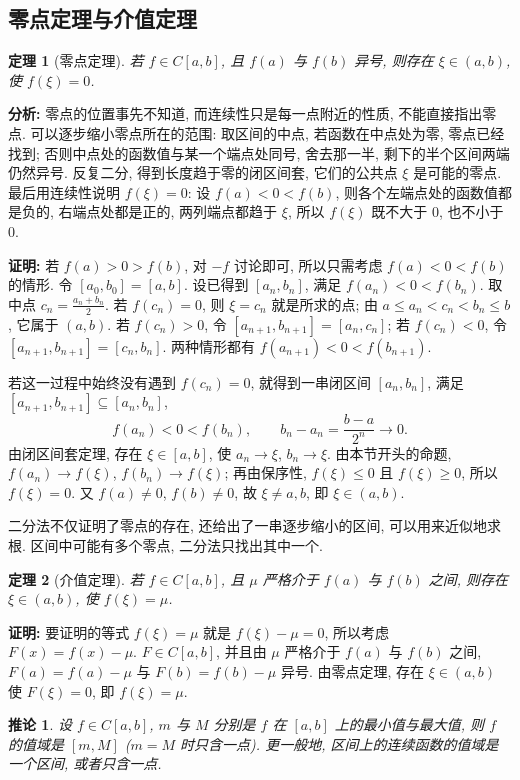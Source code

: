 \documentclass[UTF8,openany]{ctexbook}
\theoremstyle{chinesetextbook}
\newtheorem{theorem}{定理}[section]
\newenvironment{cnproof}{\par\indent\textbf{证明:} \ignorespaces}{\par}
\newtheorem*{corollarysingle}{推论}
\begin{document}
\subsection{零点定理与介值定理}
\begin{theorem}[零点定理]
若 $f\in C[a,b]$, 且 $f(a)$ 与 $f(b)$ 异号, 则存在 $\xi\in(a,b)$, 使 $f(\xi)=0$.
\end{theorem}
\par\indent\textbf{分析:} 零点的位置事先不知道, 而连续性只是每一点附近的性质, 不能直接指出零点. 可以逐步缩小零点所在的范围: 取区间的中点, 若函数在中点处为零, 零点已经找到; 否则中点处的函数值与某一个端点处同号, 舍去那一半, 剩下的半个区间两端仍然异号. 反复二分, 得到长度趋于零的闭区间套, 它们的公共点 $\xi$ 是可能的零点. 最后用连续性说明 $f(\xi)=0$: 设 $f(a)<0<f(b)$, 则各个左端点处的函数值都是负的, 右端点处都是正的, 两列端点都趋于 $\xi$, 所以 $f(\xi)$ 既不大于 $0$, 也不小于 $0$.
\begin{cnproof}
若 $f(a)>0>f(b)$, 对 $-f$ 讨论即可, 所以只需考虑 $f(a)<0<f(b)$ 的情形. 令 $[a_0,b_0]=[a,b]$. 设已得到 $[a_n,b_n]$, 满足 $f(a_n)<0<f(b_n)$. 取中点 $\displaystyle c_n=\frac{a_n+b_n}2$. 若 $f(c_n)=0$, 则 $\xi=c_n$ 就是所求的点; 由 $a\le a_n<c_n<b_n\le b$, 它属于 $(a,b)$. 若 $f(c_n)>0$, 令 $[a_{n+1},b_{n+1}]=[a_n,c_n]$; 若 $f(c_n)<0$, 令 $[a_{n+1},b_{n+1}]=[c_n,b_n]$. 两种情形都有 $f(a_{n+1})<0<f(b_{n+1})$.

若这一过程中始终没有遇到 $f(c_n)=0$, 就得到一串闭区间 $[a_n,b_n]$, 满足 $[a_{n+1},b_{n+1}]\subseteq[a_n,b_n]$,
\[
f(a_n)<0<f(b_n),\qquad b_n-a_n=\frac{b-a}{2^n}\to0.
\]
由闭区间套定理, 存在 $\xi\in[a,b]$, 使 $a_n\to\xi$, $b_n\to\xi$. 由本节开头的命题, $f(a_n)\to f(\xi)$, $f(b_n)\to f(\xi)$; 再由保序性, $f(\xi)\le0$ 且 $f(\xi)\ge0$, 所以 $f(\xi)=0$. 又 $f(a)\ne0$, $f(b)\ne0$, 故 $\xi\ne a,b$, 即 $\xi\in(a,b)$.
\end{cnproof}
二分法不仅证明了零点的存在, 还给出了一串逐步缩小的区间, 可以用来近似地求根. 区间中可能有多个零点, 二分法只找出其中一个.
\begin{theorem}[介值定理]
若 $f\in C[a,b]$, 且 $\mu$ 严格介于 $f(a)$ 与 $f(b)$ 之间, 则存在 $\xi\in(a,b)$, 使 $f(\xi)=\mu$.
\end{theorem}
\begin{cnproof}
要证明的等式 $f(\xi)=\mu$ 就是 $f(\xi)-\mu=0$, 所以考虑 $F(x)=f(x)-\mu$. $F\in C[a,b]$, 并且由 $\mu$ 严格介于 $f(a)$ 与 $f(b)$ 之间, $F(a)=f(a)-\mu$ 与 $F(b)=f(b)-\mu$ 异号. 由零点定理, 存在 $\xi\in(a,b)$ 使 $F(\xi)=0$, 即 $f(\xi)=\mu$.
\end{cnproof}
\begin{corollarysingle}
设 $f\in C[a,b]$, $m$ 与 $M$ 分别是 $f$ 在 $[a,b]$ 上的最小值与最大值, 则 $f$ 的值域是 $[m,M]$ ($m=M$ 时只含一点). 更一般地, 区间上的连续函数的值域是一个区间, 或者只含一点.
\end{corollarysingle}
\end{document}

